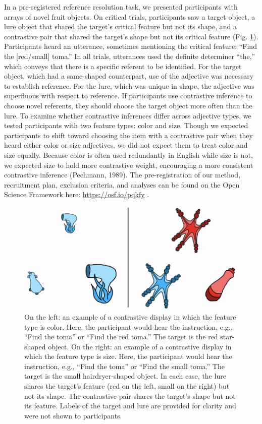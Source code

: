 \documentclass[
  english,
  man,floatsintext]{apa6}
\begin{document}
In a pre-registered reference resolution task, we presented participants with arrays of novel fruit objects. On critical trials, participants saw a target object, a lure object that shared the target's critical feature but not its shape, and a contrastive pair that shared the target's shape but not its critical feature (Fig. \ref{fig:colortrial}). Participants heard an utterance, sometimes mentioning the critical feature: ``Find the {[}red/small{]} toma.'' In all trials, utterances used the definite determiner ``the,'' which conveys that there is a specific referent to be identified. For the target object, which had a same-shaped counterpart, use of the adjective was necessary to establish reference. For the lure, which was unique in shape, the adjective was superfluous with respect to reference. If participants use contrastive inference to choose novel referents, they should choose the target object more often than the lure. To examine whether contrastive inferences differ across adjective types, we tested participants with two feature types: color and size. Though we expected participants to shift toward choosing the item with a contrastive pair when they heard either color or size adjectives, we did not expect them to treat color and size equally. Because color is often used redundantly in English while size is not, we expected size to hold more contrastive weight, encouraging a more consistent contrastive inference (Pechmann, 1989). The pre-registration of our method, recruitment plan, exclusion criteria, and analyses can be found on the Open Science Framework here: \url{https://osf.io/pqkfy} .

\begin{figure}[!tb]

{\centering \includegraphics{figs/colortrial-1} 

}

\caption{On the left: an example of a contrastive display in which the feature type is color. Here, the participant would hear the instruction, e.g., ``Find the toma'' or ``Find the red toma.'' The target is the red star-shaped object.  On the right:  an example of a contrastive display in which the feature type is size. Here, the participant would hear the instruction, e.g., ``Find the toma'' or ``Find the small toma.'' The target is the small hairdryer-shaped object. In each case, the lure shares the target's feature (red on the left, small on the right) but not its shape. The contrastive pair shares the target's shape but not its feature. Labels of the target and lure are provided for clarity and were not shown to participants.}\label{fig:colortrial}
\end{figure}
\end{document}
